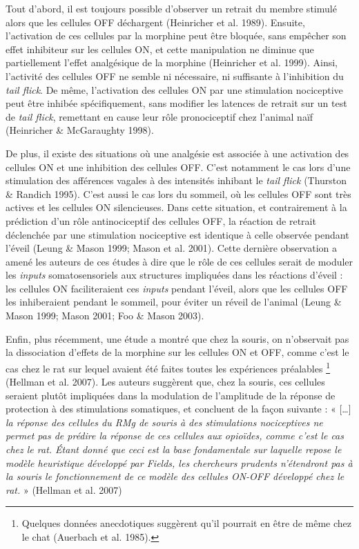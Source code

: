 \documentclass[a4paper,12pt,twoside]{report}
\begin{document}
Tout d’abord, il est toujours possible d’observer un retrait du membre stimulé alors que les cellules OFF déchargent (Heinricher et al. 1989). Ensuite, l’activation de ces cellules par la morphine peut être bloquée, sans empêcher son effet inhibiteur sur les cellules ON, et cette manipulation ne diminue que partiellement l’effet analgésique de la morphine (Heinricher et al. 1999). Ainsi, l’activité des cellules OFF ne semble ni nécessaire, ni suffisante à l’inhibition du \textit{tail flick}. De même, l’activation des cellules ON par une stimulation nociceptive peut être inhibée spécifiquement, sans modifier les latences de retrait sur un test de \textit{tail flick}, remettant en cause leur rôle pronociceptif chez l’animal naïf (Heinricher \& McGaraughty 1998).

De plus, il existe des situations où une analgésie est associée à une activation des cellules ON et une inhibition des cellules OFF. C’est notamment le cas lors d’une stimulation des afférences vagales à des intensités inhibant le \textit{tail flick} (Thurston \& Randich 1995). C’est aussi le cas lors du sommeil, où les cellules OFF sont très actives et les cellules ON silencieuses. Dans cette situation, et contrairement à la prédiction d’un rôle antinociceptif des cellules OFF, la réaction de retrait déclenchée par une stimulation nociceptive est identique à celle observée pendant l’éveil (Leung \& Mason 1999; Mason et al. 2001). Cette dernière observation a amené les auteurs de ces études à dire que le rôle de ces cellules serait de moduler les \textit{inputs} somatosensoriels aux structures impliquées dans les réactions d’éveil : les cellules ON faciliteraient ces \textit{inputs} pendant l’éveil, alors que les cellules OFF les inhiberaient pendant le sommeil, pour éviter un réveil de l’animal (Leung \& Mason 1999; Mason 2001; Foo \& Mason 2003).

Enfin, plus récemment, une étude a montré que chez la souris, on n’observait pas la dissociation d’effets de la morphine sur les cellules ON et OFF, comme c’est le cas chez le rat sur lequel avaient été faites toutes les expériences préalables
\footnote{Quelques données anecdotiques suggèrent qu’il pourrait en être de même chez le chat (Auerbach et al. 1985).} 
(Hellman et al. 2007). Les auteurs suggèrent que, chez la souris, ces cellules seraient plutôt impliquées dans la modulation de l’amplitude de la réponse de protection à des stimulations somatiques, et concluent de la façon suivante : « [\ldots] \textit{la réponse des cellules du RMg de souris à des stimulations nociceptives ne permet pas de prédire la réponse de ces cellules aux opioïdes, comme c’est le cas chez le rat. Étant donné que ceci est \emph{la base fondamentale sur laquelle repose le modèle heuristique développé par Fields}, les chercheurs prudents n’étendront pas à la souris le fonctionnement de ce modèle des cellules ON-OFF développé chez le rat.} » (Hellman et al. 2007)
\end{document}
